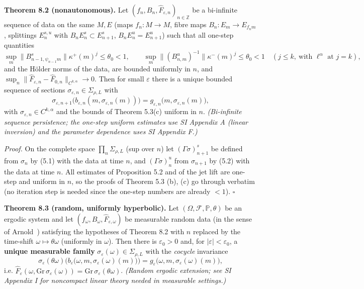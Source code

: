 \documentclass[11pt,a4paper]{article}
\theoremstyle{plain}
\theoremstyle{definition}
\theoremstyle{remark}
\numberwithin{equation}{section}
\numberwithin{figure}{section}
\begin{document}
\textbf{Theorem 8.2 (nonautonomous).} Let $(f_n,B_n,\widehat F_{\varepsilon,n})_{n\in\mathbb Z}$ be a bi-infinite sequence of data on the same $M,E$ (maps $f_n:M\to M$, fibre maps $B_n:E_m\to E_{f_nm}$, splittings $E^{s,u}_n$ with $B_nE^s_n\subset E^s_{n+1}$, $B_nE^u_n=E^u_{n+1}$) such that all one-step quantities
\[
\sup_m\|B^s_{n-1,\psi_{n-1}m}\|\kappa^+(m)^j\le\theta_0<1,\qquad\sup_m\|(B^u_{n,m})^{-1}\|\kappa^-(m)^j\le\theta_0<1\quad(j\le k,\ \text{with }\ell^\alpha\text{ at }j=k),
\]
and the Hölder norms of the data, are bounded uniformly in $n$, and $\sup_n\|\widehat F_{\varepsilon,n}-\widehat F_{0,n}\|_{C^{k,\alpha}}\to0$. Then for small $\varepsilon$ there is a unique bounded sequence of sections $\sigma_{\varepsilon,n}\in\Sigma_{\rho,L}$ with
\[
\sigma_{\varepsilon,n+1}\big(b_{\varepsilon,n}(m,\sigma_{\varepsilon,n}(m))\big)=g_{\varepsilon,n}\big(m,\sigma_{\varepsilon,n}(m)\big),
\]
with $\sigma_{\varepsilon,n}\in C^{k,\alpha}$ and the bounds of Theorem 5.3(c) uniform in $n$. \textit{(Bi-infinite sequence persistence; the one-step uniform estimates use SI Appendix A (linear inversion) and the parameter dependence uses SI Appendix F.)}

\textit{Proof.} On the complete space $\prod_n\Sigma_{\rho,L}$ (sup over $n$) let $(\Gamma\sigma)^s_{n+1}$ be defined from $\sigma_n$ by (5.1) with the data at time $n$, and $(\Gamma\sigma)^u_n$ from $\sigma_{n+1}$ by (5.2) with the data at time $n$. All estimates of Proposition 5.2 and of the jet lift are one-step and uniform in $n$, so the proofs of Theorem 5.3 (b), (c) go through verbatim (no iteration step is needed since the one-step numbers are already $<1$). $\square$

\textbf{Theorem 8.3 (random, uniformly hyperbolic).} Let $(\Omega,\mathcal F,\mathbb P,\theta)$ be an ergodic system and let $(f_\omega,B_\omega,\widehat F_{\varepsilon,\omega})$ be measurable random data (in the sense of Arnold~\cite{arn98}) satisfying the hypotheses of Theorem 8.2 with $n$ replaced by the time-shift $\omega\mapsto\theta\omega$ (uniformly in $\omega$). Then there is $\varepsilon_0>0$ and, for $|\varepsilon|<\varepsilon_0$, a \textbf{unique measurable family} $\sigma_\varepsilon(\omega)\in\Sigma_{\rho,L}$ with the \textit{cocycle} invariance
\[
\sigma_\varepsilon(\theta\omega)\Big(b_\varepsilon\big(\omega,m,\sigma_\varepsilon(\omega)(m)\big)\Big)=g_\varepsilon\big(\omega,m,\sigma_\varepsilon(\omega)(m)\big),
\]
i.e. $\widehat F_{\varepsilon}(\omega,\mathrm{Gr}\,\sigma_\varepsilon(\omega))=\mathrm{Gr}\,\sigma_\varepsilon(\theta\omega)$. \textit{(Random ergodic extension; see SI Appendix I for noncompact linear theory needed in measurable settings.)}
\end{document}
